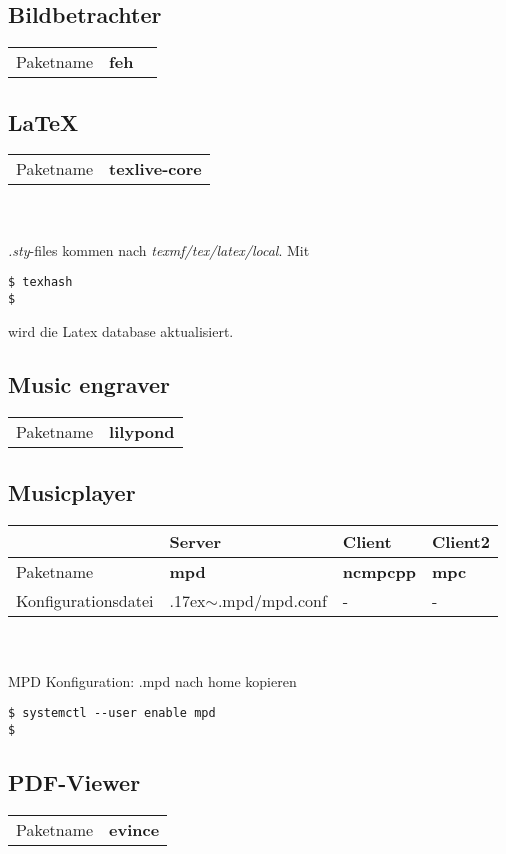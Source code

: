 \subsection{Bildbetrachter}
\begin{tabular}{l|l|l}
Paketname & \textbf{feh} \\ 
\end{tabular}

\subsection{\LaTeX}
\begin{tabular}{l|l}
Paketname & \textbf{texlive-core} \\ 
\end{tabular}
\\ \\
\emph{.sty}-files kommen nach \emph{texmf/tex/latex/local}.
Mit 
\begin{lstlisting}[style=Bash, frame=none]
$ texhash
$
\end{lstlisting}
wird die Latex database aktualisiert.
\subsection{Music engraver}
\begin{tabular}{l|l}
Paketname & \textbf{lilypond} \\ 
\end{tabular}

\subsection{Musicplayer}
\begin{tabular}{l|l|l|l}
~ & Server & Client & Client2 \\ \hline
    Paketname & \textbf{mpd} & \textbf{ncmpcpp} & \textbf{mpc} \\ 
    Konfigurationsdatei & {{\raise.17ex\hbox{$\scriptstyle\mathtt{\sim}$}}.mpd/mpd.conf} & - & - \\
\end{tabular}
\\ \\
MPD Konfiguration:
.mpd nach home kopieren
\begin{lstlisting}[style=Bash]
$ systemctl --user enable mpd
$
\end{lstlisting}

\subsection{PDF-Viewer}
\begin{tabular}{l|l}
Paketname & \textbf{evince} \\ 
\end{tabular}


